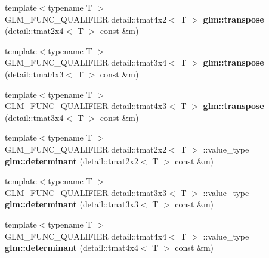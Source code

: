 \begin{DoxyCompactItemize}
\item 
\hypertarget{namespaceglm_a002e61c20163bd62a0af2d18a9a3af7a}{{\footnotesize template$<$typename T $>$ }\\\-G\-L\-M\-\_\-\-F\-U\-N\-C\-\_\-\-Q\-U\-A\-L\-I\-F\-I\-E\-R \*
detail\-::tmat4x2$<$ \-T $>$ {\bfseries glm\-::transpose} (detail\-::tmat2x4$<$ \-T $>$ const \&m)}\label{namespaceglm_a002e61c20163bd62a0af2d18a9a3af7a}

\item 
\hypertarget{namespaceglm_ab3249f9f058bed8dfae6bf98f388ba7e}{{\footnotesize template$<$typename T $>$ }\\\-G\-L\-M\-\_\-\-F\-U\-N\-C\-\_\-\-Q\-U\-A\-L\-I\-F\-I\-E\-R \*
detail\-::tmat3x4$<$ \-T $>$ {\bfseries glm\-::transpose} (detail\-::tmat4x3$<$ \-T $>$ const \&m)}\label{namespaceglm_ab3249f9f058bed8dfae6bf98f388ba7e}

\item 
\hypertarget{namespaceglm_ada628757003c8d123a0c92140d7abe71}{{\footnotesize template$<$typename T $>$ }\\\-G\-L\-M\-\_\-\-F\-U\-N\-C\-\_\-\-Q\-U\-A\-L\-I\-F\-I\-E\-R \*
detail\-::tmat4x3$<$ \-T $>$ {\bfseries glm\-::transpose} (detail\-::tmat3x4$<$ \-T $>$ const \&m)}\label{namespaceglm_ada628757003c8d123a0c92140d7abe71}

\item 
\hypertarget{namespaceglm_af46227c76d96e80fee1fd796c8bcd381}{{\footnotesize template$<$typename T $>$ }\\\-G\-L\-M\-\_\-\-F\-U\-N\-C\-\_\-\-Q\-U\-A\-L\-I\-F\-I\-E\-R \*
detail\-::tmat2x2$<$ \-T $>$\*
\-::value\-\_\-type {\bfseries glm\-::determinant} (detail\-::tmat2x2$<$ \-T $>$ const \&m)}\label{namespaceglm_af46227c76d96e80fee1fd796c8bcd381}

\item 
\hypertarget{namespaceglm_a82f21c90b1e7ac79de26ae25db61b841}{{\footnotesize template$<$typename T $>$ }\\\-G\-L\-M\-\_\-\-F\-U\-N\-C\-\_\-\-Q\-U\-A\-L\-I\-F\-I\-E\-R \*
detail\-::tmat3x3$<$ \-T $>$\*
\-::value\-\_\-type {\bfseries glm\-::determinant} (detail\-::tmat3x3$<$ \-T $>$ const \&m)}\label{namespaceglm_a82f21c90b1e7ac79de26ae25db61b841}

\item 
\hypertarget{namespaceglm_a8d6ce863c226bb3e6f7c607a82fcbb35}{{\footnotesize template$<$typename T $>$ }\\\-G\-L\-M\-\_\-\-F\-U\-N\-C\-\_\-\-Q\-U\-A\-L\-I\-F\-I\-E\-R \*
detail\-::tmat4x4$<$ \-T $>$\*
\-::value\-\_\-type {\bfseries glm\-::determinant} (detail\-::tmat4x4$<$ \-T $>$ const \&m)}\label{namespaceglm_a8d6ce863c226bb3e6f7c607a82fcbb35}


\end{DoxyCompactItemize}
